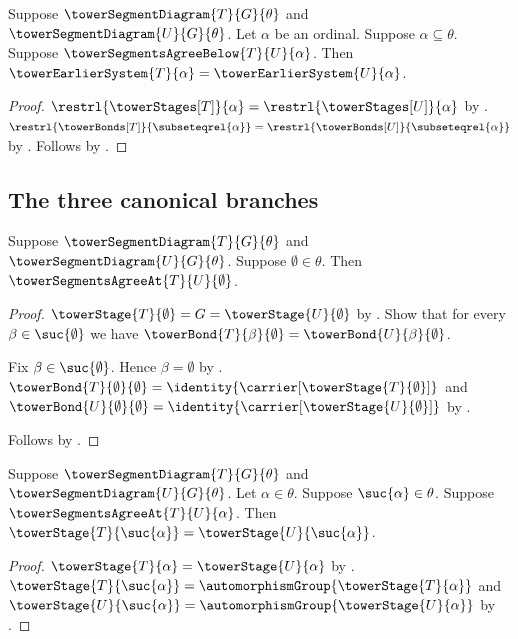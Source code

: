 \begin{theorem}\label{tower_agreement_earlier_systems}
    Suppose $\towerSegmentDiagram{T}{G}{\theta}$ and
        $\towerSegmentDiagram{U}{G}{\theta}$.
    Let $\alpha$ be an ordinal.
    Suppose $\alpha\subseteq\theta$.
    Suppose $\towerSegmentsAgreeBelow{T}{U}{\alpha}$.
    Then $\towerEarlierSystem{T}{\alpha}=
        \towerEarlierSystem{U}{\alpha}$.
\end{theorem}
\begin{proof}
    $\restrl{\towerStages[T]}{\alpha}=
        \restrl{\towerStages[U]}{\alpha}$ by
        .
    $\restrl{\towerBonds[T]}{\subseteqrel{\alpha}}=
        \restrl{\towerBonds[U]}{\subseteqrel{\alpha}}$ by
        .
    Follows by .
\end{proof}

\subsection{The three canonical branches}

\begin{proposition}\label{tower_segments_agree_at_zero}
    Suppose $\towerSegmentDiagram{T}{G}{\theta}$ and
        $\towerSegmentDiagram{U}{G}{\theta}$.
    Suppose $\emptyset\in\theta$.
    Then $\towerSegmentsAgreeAt{T}{U}{\emptyset}$.
\end{proposition}
\begin{proof}
    $\towerStage{T}{\emptyset}=G=\towerStage{U}{\emptyset}$ by
        .
    Show that for every $\beta\in\suc{\emptyset}$ we have
        $\towerBond{T}{\beta}{\emptyset}=
            \towerBond{U}{\beta}{\emptyset}$.
    \begin{subproof}
        Fix $\beta\in\suc{\emptyset}$.
        Hence $\beta=\emptyset$ by .
        $\towerBond{T}{\emptyset}{\emptyset}=
                \identity{\carrier[\towerStage{T}{\emptyset}]}$ and
            $\towerBond{U}{\emptyset}{\emptyset}=
                \identity{\carrier[\towerStage{U}{\emptyset}]}$ by
            .
    \end{subproof}
    Follows by .
\end{proof}

\begin{proposition}\label{tower_successor_stage_agreement}
    Suppose $\towerSegmentDiagram{T}{G}{\theta}$ and
        $\towerSegmentDiagram{U}{G}{\theta}$.
    Let $\alpha\in\theta$.
    Suppose $\suc{\alpha}\in\theta$.
    Suppose $\towerSegmentsAgreeAt{T}{U}{\alpha}$.
    Then $\towerStage{T}{\suc{\alpha}}=
        \towerStage{U}{\suc{\alpha}}$.
\end{proposition}
\begin{proof}
    $\towerStage{T}{\alpha}=\towerStage{U}{\alpha}$ by
        .
    $\towerStage{T}{\suc{\alpha}}=
            \automorphismGroup{\towerStage{T}{\alpha}}$ and
        $\towerStage{U}{\suc{\alpha}}=
            \automorphismGroup{\towerStage{U}{\alpha}}$ by
        .
\end{proof}


